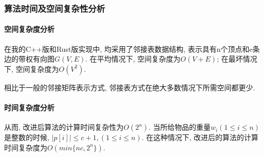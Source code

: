 \subsubsection{算法时间及空间复杂性分析}
\paragraph{空间复杂度分析}
在我的C++版和Rust版实现中, 均采用了邻接表数据结构,
表示具有n个顶点和e条边的带权有向图$G(V, E)$. 在平均情况下, 空间复杂度为$O(V+E)$;
在最坏情况下, 空间复杂度为$O(V^2)$.\par

相比于一般的邻接矩阵表示方式, 邻接表方式在绝大多数情况下所需空间都更少.

\paragraph{时间复杂度分析}


从而, 改进后算法的计算时间复杂性为$O(2^n)$. 当所给物品的重量$w_i(1\leq i\leq n)$
是整数的时候, $|p[i]|\leq c+1, (1\leq i\leq n)$. 在这种情况下,
改进后的算法的计算时间复杂度为$O(min\{nc, 2^n\})$.

